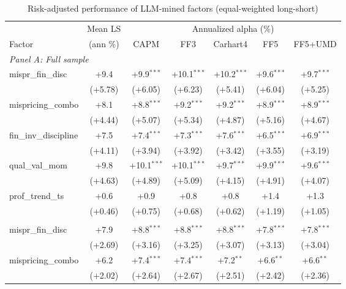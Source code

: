 \begin{table}[htbp]\centering
\caption{Risk-adjusted performance of LLM-mined factors (equal-weighted long-short)}
\label{tab:alphas_ew}
\begin{threeparttable}\footnotesize
\begin{tabular}{lcccccc}
\toprule
 & Mean LS & \multicolumn{5}{c}{Annualized alpha (\%)} \\
\cmidrule(lr){3-7}
Factor & (ann \%) & CAPM & FF3 & Carhart4 & FF5 & FF5+UMD \\
\midrule
\multicolumn{7}{l}{\textit{Panel A: Full sample}} \\
\addlinespace
mispr\_fin\_disc & +9.4 & +9.9$^{***}$ & +10.1$^{***}$ & +10.2$^{***}$ & +9.6$^{***}$ & +9.7$^{***}$ \\
 & (+5.78) & (+6.05) & (+6.23) & (+5.41) & (+6.04) & (+5.25) \\
\addlinespace
mispricing\_combo & +8.1 & +8.8$^{***}$ & +9.2$^{***}$ & +9.2$^{***}$ & +8.9$^{***}$ & +8.9$^{***}$ \\
 & (+4.44) & (+5.07) & (+5.34) & (+4.87) & (+5.16) & (+4.67) \\
\addlinespace
fin\_inv\_discipline & +7.5 & +7.4$^{***}$ & +7.3$^{***}$ & +7.6$^{***}$ & +6.5$^{***}$ & +6.9$^{***}$ \\
 & (+4.11) & (+3.94) & (+3.92) & (+3.42) & (+3.55) & (+3.19) \\
\addlinespace
qual\_val\_mom & +9.8 & +10.1$^{***}$ & +10.1$^{***}$ & +9.7$^{***}$ & +9.9$^{***}$ & +9.6$^{***}$ \\
 & (+4.63) & (+4.89) & (+5.09) & (+4.15) & (+4.91) & (+4.07) \\
\addlinespace
prof\_trend\_ts & +0.6 & +0.9 & +0.8 & +0.8 & +1.4 & +1.3 \\
 & (+0.46) & (+0.75) & (+0.68) & (+0.62) & (+1.19) & (+1.05) \\
\addlinespace
\midrule
\multicolumn{7}{l}{\textit{Panel B: Out-of-sample (post-2000-12-31)}} \\
\addlinespace
mispr\_fin\_disc & +7.9 & +8.8$^{***}$ & +8.8$^{***}$ & +8.8$^{***}$ & +7.8$^{***}$ & +7.8$^{***}$ \\
 & (+2.69) & (+3.16) & (+3.25) & (+3.07) & (+3.13) & (+3.04) \\
\addlinespace
mispricing\_combo & +6.2 & +7.4$^{***}$ & +7.4$^{***}$ & +7.2$^{**}$ & +6.6$^{**}$ & +6.6$^{**}$ \\
 & (+2.02) & (+2.64) & (+2.67) & (+2.51) & (+2.42) & (+2.36) \\

\end{tabular}
\end{threeparttable}
\end{table}
